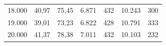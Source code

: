\begin{table}[ht]
\begin{tabular}{lcccccc}
18.000              & 40,97                                                             & 75,45                                                           & 6.871              & 432               & 10.243             & 300              \\
19.000              & 39,01                                                             & 73,23                                                           & 6.822              & 428               & 10.791             & 333              \\
20.000              & 41,37                                                             & 78,38                                                           & 7.011              & 432               & 10.103             & 232              \\ \hline
\end{tabular}
\end{table}

